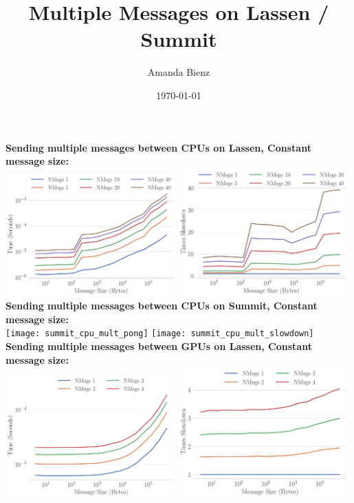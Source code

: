 \documentclass{article}
\title{Multiple Messages on Lassen / Summit}
\author{Amanda Bienz}
\date{\today}
\begin{document}
\maketitle

\textbf{Sending multiple messages between CPUs on Lassen, Constant message size:}\\
\includegraphics[width=0.49\textwidth]{lassen_cpu_mult_pong}
\includegraphics[width=0.49\textwidth]{lassen_cpu_mult_slowdown}\\

\textbf{Sending multiple messages between CPUs on Summit, Constant message size:}\\
\texttt{[image: summit\_cpu\_mult\_pong]}
\texttt{[image: summit\_cpu\_mult\_slowdown]}\\


\textbf{Sending multiple messages between GPUs on Lassen, Constant message size:}\\
\includegraphics[width=0.49\textwidth]{lassen_gpu_mult_pong}
\includegraphics[width=0.49\textwidth]{lassen_gpu_mult_slowdown}\\
\end{document}
